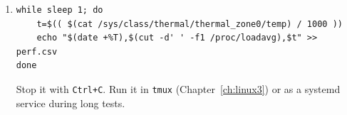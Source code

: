 \begin{enumerate}[label=\textbf{\ansnum.\arabic*}]
  \item[\textbf{\ansnum.10}] 
\begin{verbatim}
while sleep 1; do
    t=$(( $(cat /sys/class/thermal/thermal_zone0/temp) / 1000 ))
    echo "$(date +%T),$(cut -d' ' -f1 /proc/loadavg),$t" >> perf.csv
done
\end{verbatim}
  Stop it with \texttt{Ctrl+C}. Run it in \texttt{tmux} (Chapter~\ref{ch:linux3}) or as a systemd service during long tests.
\end{enumerate}
